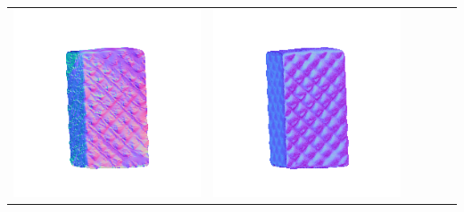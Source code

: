 \begin{center}
\begin{tabularx}{\linewidth}{@{}Y@{}Y@{}Y@{}Y@{}Y@{}Y@{}}
\includegraphics[width=\linewidth]{semisynthetic/20160617_18_yu_out.png} &
\includegraphics[width=\linewidth]{semisynthetic/20160617_18_dpsn_out.png} &

\end{tabularx}
\end{center}
